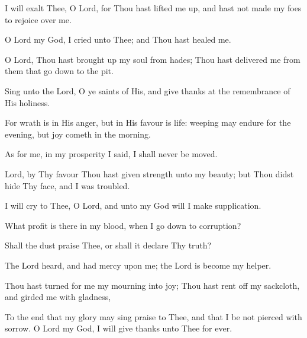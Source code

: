 I will exalt Thee, O Lord, for Thou hast lifted me up, and hast not made my foes to rejoice over me.

O Lord my God, I cried unto Thee; and Thou hast healed me.

O Lord, Thou hast brought up my soul from hades; Thou hast delivered me from them that go down to the pit.

Sing unto the Lord, O ye saints of His, and give thanks at the remembrance of His holiness.

For wrath is in His anger, but in His favour is life: weeping may endure for the evening, but joy cometh in the morning.

As for me, in my prosperity I said, I shall never be moved.

Lord, by Thy favour Thou hast given strength unto my beauty; but Thou didst hide Thy face, and I was troubled.

I will cry to Thee, O Lord, and unto my God will I make supplication.

What profit is there in my blood, when I go down to corruption?

Shall the dust praise Thee, or shall it declare Thy truth?

The Lord heard, and had mercy upon me; the Lord is become my helper.

Thou hast turned for me my mourning into joy; Thou hast rent off my sackcloth, and girded me with gladness,

To the end that my glory may sing praise to Thee, and that I be not pierced with sorrow. O Lord my God, I will give thanks unto Thee for ever.
